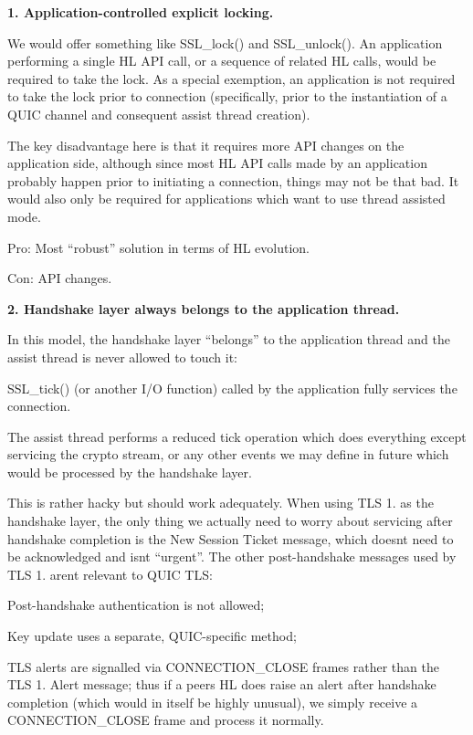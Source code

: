 \begin{DoxyItemize}
\item {\bfseries{1. Application-\/controlled explicit locking.}}

We would offer something like {\ttfamily SSL\+\_\+lock()} and {\ttfamily SSL\+\_\+unlock()}. An application performing a single HL API call, or a sequence of related HL calls, would be required to take the lock. As a special exemption, an application is not required to take the lock prior to connection (specifically, prior to the instantiation of a QUIC channel and consequent assist thread creation).

The key disadvantage here is that it requires more API changes on the application side, although since most HL API calls made by an application probably happen prior to initiating a connection, things may not be that bad. It would also only be required for applications which want to use thread assisted mode.

Pro\+: Most “robust” solution in terms of HL evolution.

Con\+: API changes.
\item {\bfseries{2. Handshake layer always belongs to the application thread.}}

In this model, the handshake layer “belongs” to the application thread and the assist thread is never allowed to touch it\+:
\begin{DoxyItemize}
\item {\ttfamily SSL\+\_\+tick()} (or another I/O function) called by the application fully services the connection.
\item The assist thread performs a reduced tick operation which does everything except servicing the crypto stream, or any other events we may define in future which would be processed by the handshake layer.
\item This is rather hacky but should work adequately. When using TLS 1. as the handshake layer, the only thing we actually need to worry about servicing after handshake completion is the New Session Ticket message, which doesn\textquotesingle{}t need to be acknowledged and isn\textquotesingle{}t “urgent”. The other post-\/handshake messages used by TLS 1. aren\textquotesingle{}t relevant to QUIC TLS\+:
\begin{DoxyItemize}
\item Post-\/handshake authentication is not allowed;
\item Key update uses a separate, QUIC-\/specific method;
\item TLS alerts are signalled via {\ttfamily CONNECTION\+\_\+\+CLOSE} frames rather than the TLS 1. Alert message; thus if a peer\textquotesingle{}s HL does raise an alert after handshake completion (which would in itself be highly unusual), we simply receive a {\ttfamily CONNECTION\+\_\+\+CLOSE} frame and process it normally.
\end{DoxyItemize}
\end{DoxyItemize}


\end{DoxyItemize}
